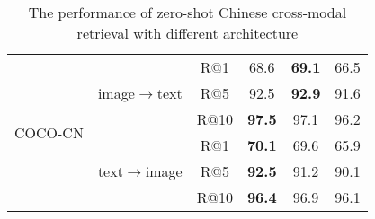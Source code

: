 \documentclass{article}
\begin{document}
\begin{table}[]
\begin{tabular}{@{}cccccc@{}}
\multicolumn{1}{c|}{\multirow{7}{*}{COCO-CN}} & \multirow{3}{*}{image$\to$text} & \multicolumn{1}{c|}{R@1} & \multicolumn{1}{c|}{68.6} & \multicolumn{1}{c|}{\textbf{69.1}} & \multicolumn{1}{c}{66.5} \\
\multicolumn{1}{c|}{} &  & \multicolumn{1}{c|}{R@5} & \multicolumn{1}{c|}{92.5} & \multicolumn{1}{c|}{\textbf{92.9}} & \multicolumn{1}{c}{91.6}  \\
\multicolumn{1}{c|}{} &  & \multicolumn{1}{c|}{R@10} & \multicolumn{1}{c|}{\textbf{97.5}} & \multicolumn{1}{c|}{97.1} & \multicolumn{1}{c}{96.2}  \\ \cmidrule(l){2-6} 
\multicolumn{1}{c|}{} & \multirow{3}{*}{text$\to$image} & \multicolumn{1}{c|}{R@1} & \multicolumn{1}{c|}{\textbf{70.1}} & \multicolumn{1}{c|}{69.6} & \multicolumn{1}{c}{65.9} \\
\multicolumn{1}{c|}{} &  & \multicolumn{1}{c|}{R@5} & \multicolumn{1}{c|}{\textbf{92.5}} & \multicolumn{1}{c|}{91.2} & \multicolumn{1}{c}{90.1}  \\
\multicolumn{1}{c|}{} &  & \multicolumn{1}{c|}{R@10} & \multicolumn{1}{c|}{\textbf{96.4}} & \multicolumn{1}{c|}{96.9} & \multicolumn{1}{c}{96.1}  \\ \bottomrule
\end{tabular}
\caption{The performance of zero-shot Chinese cross-modal retrieval with different architecture}
\label{details_results}
\end{table}
\end{document}
